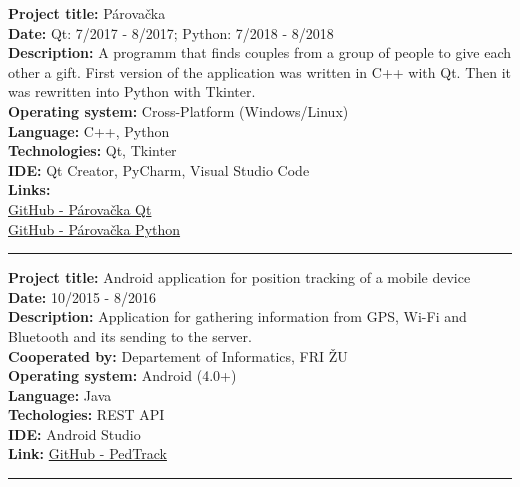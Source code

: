 \documentclass[slovak]{article}
\begin{document}
\noindent
\textbf{Project title:} Párovačka\\
\textbf{Date:} Qt: 7/2017 - 8/2017; Python: 7/2018 - 8/2018\\
\textbf{Description:} A programm that finds couples from a group of people to give each other a gift. First version of the application was written in C++ with Qt. Then it was rewritten into Python with Tkinter.\\
\textbf{Operating system:} Cross-Platform (Windows/Linux)\\
\textbf{Language:} C++, Python\\
\textbf{Technologies:} Qt, Tkinter\\
\textbf{IDE:} Qt Creator, PyCharm, Visual Studio Code\\
\textbf{Links:}\\
\href{https://github.com/kyberdrb/Parovacka\_Qt}{GitHub - Párovačka Qt}\\
\href{https://github.com/kyberdrb/Parovacka\_Python}{GitHub - Párovačka Python}

\begin{center}\rule{3in}{0.4pt}\end{center}

\noindent
\textbf{Project title:} Android application for position tracking of a mobile device\\
\textbf{Date:} 10/2015 - 8/2016\\
\textbf{Description:} Application for gathering information from GPS, Wi-Fi and Bluetooth and its sending to the server.\\
\textbf{Cooperated by:} Departement of Informatics, FRI ŽU\\
\textbf{Operating system:} Android (4.0+)\\
\textbf{Language:} Java\\
\textbf{Techologies:} REST API\\
\textbf{IDE:} Android Studio\\
\textbf{Link:} \href{https://github.com/kyberdrb/PedTrack}{GitHub - PedTrack}

\begin{center}\rule{3in}{0.4pt}\end{center}
\end{document}
